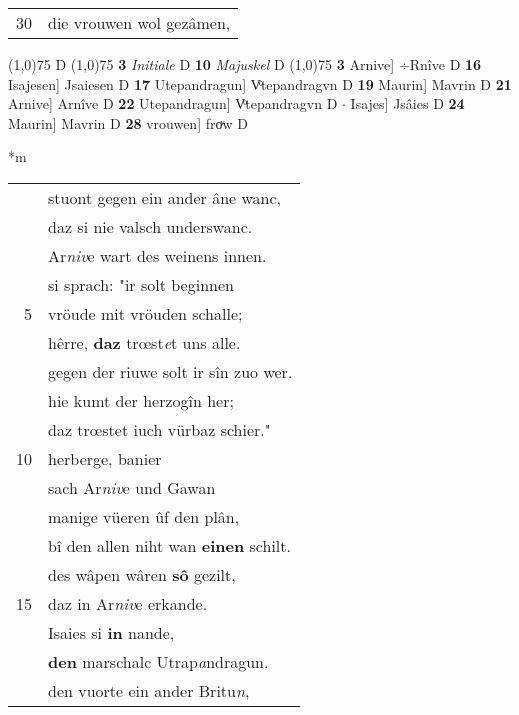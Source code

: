 \documentclass[8pt,a4paper,notitlepage]{article}
\begin{document}
\begin{table}[ht]
\begin{minipage}[t]{0.5\linewidth}
\begin{tabular}{rl}
30 & die vrouwen wol gezâmen,\\ 
\end{tabular}
\scriptsize
\line(1,0){75} \newline
D \newline
\line(1,0){75} \newline
\textbf{3} \textit{Initiale} D  \textbf{10} \textit{Majuskel} D  \newline
\line(1,0){75} \newline
\textbf{3} Arnive] ÷Rnîve D \textbf{16} Isajesen] Jsaiesen D \textbf{17} Utepandragun] Vͦtepandragvn D \textbf{19} Maurin] Mavrin D \textbf{21} Arnive] Arnîve D \textbf{22} Utepandragun] Vͦtepandragvn D  $\cdot$ Isajes] Jsâies D \textbf{24} Maurin] Mavrin D \textbf{28} vrouwen] froͮw D \newline
\end{minipage}
\hspace{0.5cm}
\begin{minipage}[t]{0.5\linewidth}
\small
\begin{center}*m
\end{center}
\begin{tabular}{rl}
 & stuont gegen ein ander âne wanc,\\ 
 & daz si nie valsch underswanc.\\ 
 & Ar\textit{niv}e wart des weinens innen.\\ 
 & si sprach: "ir solt beginnen\\ 
5 & vröude mit vröuden schalle;\\ 
 & hêrre, \textbf{daz} trœst\textit{e}t uns alle.\\ 
 & gegen der riuwe solt ir sîn zuo wer.\\ 
 & hie kumt der herzogîn her;\\ 
 & daz trœstet iuch vürbaz schier."\\ 
10 & herberge, banier\\ 
 & sach Ar\textit{niv}e und Gawan\\ 
 & manige vüeren ûf den plân,\\ 
 & bî den allen niht wan \textbf{einen} schilt.\\ 
 & des wâpen wâren \textbf{sô} gezilt,\\ 
15 & daz in Ar\textit{niv}e erkande.\\ 
 & Isaies si \textbf{in} nande,\\ 
 & \textbf{den} marschalc Utrap\textit{a}ndragun.\\ 
 & den vuorte ein ander Britu\textit{n},\\ 

\end{tabular}
\end{minipage}
\end{table}
\end{document}
